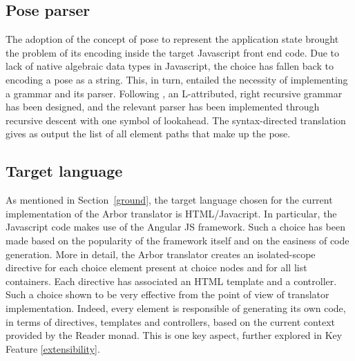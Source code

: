 \documentclass[12pt]{article} %
\newcommand{\fe}{front end}
\newcommand{\adt}{algebraic data type}
\newcommand{\A}{Arbor}
\begin{document}
\subsection{Pose parser}
The adoption of the concept of pose to represent the application state brought the problem of its encoding inside the target Javascript \fe{} code. Due to lack of native \adt{}s in Javascript, the choice has fallen back to encoding a pose as a string. This, in turn, entailed the necessity of implementing a grammar and its parser.
Following \cite{aho}, an L-attributed, right recursive grammar has been designed, and the relevant parser has been implemented through recursive descent with one symbol of lookahead. The syntax-directed translation gives as output the list of all element paths that make up the pose.
\subsection{Target language}
As mentioned in Section~\ref{ground}, the target language chosen for the current implementation of the \A{} translator is HTML/Javacript. In particular, the Javascript code makes use of the Angular JS framework. Such a choice has been made based on the popularity of the framework itself and on the easiness of code generation. More in detail, the \A{} translator creates an isolated-scope directive for each choice element present at choice nodes and for all list containers. Each directive has associated an HTML template and a controller. Such a choice shown to be very effective from the point of view of translator implementation. Indeed, every element is responsible of generating its own code, in terms of directives, templates and controllers, based on the current context provided by the Reader monad. This is one key aspect, further explored in Key Feature \ref{extensibility}.\\
\end{document}
